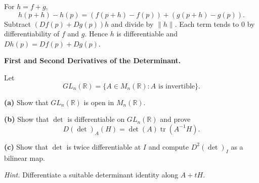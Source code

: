\begin{solution}
For $h=f+g$,
	\[
	h(p+h)-h(p) = (f(p+h)-f(p))+(g(p+h)-g(p)).
	\]
	Subtract $(Df(p)+Dg(p))h$ and divide by $\|h\|$. Each term tends to $0$ by differentiability of $f$ and $g$.
	Hence $h$ is differentiable and $Dh(p)=Df(p)+Dg(p)$.
\end{solution}

\begin{problem}[CP-II-0184]
\label{prob:cp-ii-0184}
\textbf{First and Second Derivatives of the Determinant.}

\hspace*{1.5em}Let
\[
GL_n(\mathbb R)=\{A\in M_n(\mathbb R):A\text{ is invertible}\}.
\]

\par\smallskip\noindent\textbf{(a)}\quad
Show that \(GL_n(\mathbb R)\) is open in \(M_n(\mathbb R)\).

\par\smallskip\noindent\textbf{(b)}\quad
Show that \(\det\) is differentiable on \(GL_n(\mathbb R)\) and prove
\[
D(\det)_A(H)=\det(A)\operatorname{tr}(A^{-1}H).
\]

\par\smallskip\noindent\textbf{(c)}\quad
Show that \(\det\) is twice differentiable at \(I\) and compute
\(D^2(\det)_I\) as a bilinear map.

\emph{Hint.} Differentiate a suitable determinant identity along \(A+tH\).
\end{problem}

